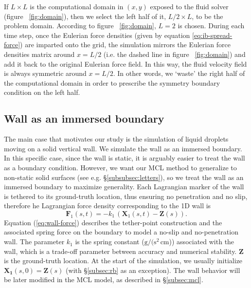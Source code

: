 \documentclass{jfm}
\newcommand{\charles}[1]{\todo[inline,color=blue!40]{Charles: #1}}
\begin{document}
If $L \times L$ is the computational domain in $(x,y)$ exposed to the fluid solver (figure ~\ref{fig:domain}), then we select the left half of it, $L/2 \times L$, to be the problem domain. According to figure ~\ref{fig:domain}, $L=2$ is chosen. During each time step, once the Eulerian force densities (given by equation \ref{eq:ib-spread-force}) are imparted onto the grid, the simulation mirrors the Eulerian force densities matrix around $x = L/2$ (i.e. the dashed line in figure ~\ref{fig:domain}) and add it back to the original Eulerian force field. In this way, the fluid velocity field is always symmetric around $x = L/2$. In other words, we `waste' the right half of the computational domain in order to prescribe the symmetry boundary condition on the left half. 


\subsection{Wall as an immersed boundary} \label{subsec:wall}
The main case that motivates our study is the simulation of liquid droplets moving on a solid vertical wall. We simulate the wall as an immersed boundary. In this specific case, since the wall is static, it is arguably easier to treat the wall as a boundary condition. However, we want our MCL method to generalize to non-static solid surfaces (see e.g. \S\ref{subsubsec:letters}), so we treat the wall as an immersed boundary to maximize generality. Each Lagrangian marker of the wall is tethered to its ground-truth location, thus ensuring no penetration and no slip, therefore he Lagrangian force density corresponding to the 1D wall is
\begin{equation}
\bm{F}_1(s,t) = -k_1 \, (
    \bm{X}_1(s,t) - \bm{Z}(s)
). 
\label{eq:wall-force}
\end{equation}
Equation (\ref{eq:wall-force}) describes the tether-point construction and the associated spring force on the boundary to model a no-slip and no-penetration wall. The parameter $k_1$ is the spring constant ($\text{g}/(\text{s}^2\,\text{cm}$)) associated with the wall, which is a trade-off parameter between accuracy and numerical stability. $\boldsymbol{Z}$ is the ground-truth location. At the start of the simulation, we usually initialize $\boldsymbol{X_1}(s,0) = \boldsymbol{Z}(s)$ (with \S\ref{subsec:rb} as an exception). The wall behavior will be later modified in the MCL model, as described in \S\ref{subsec:mcl}. 
\end{document}
